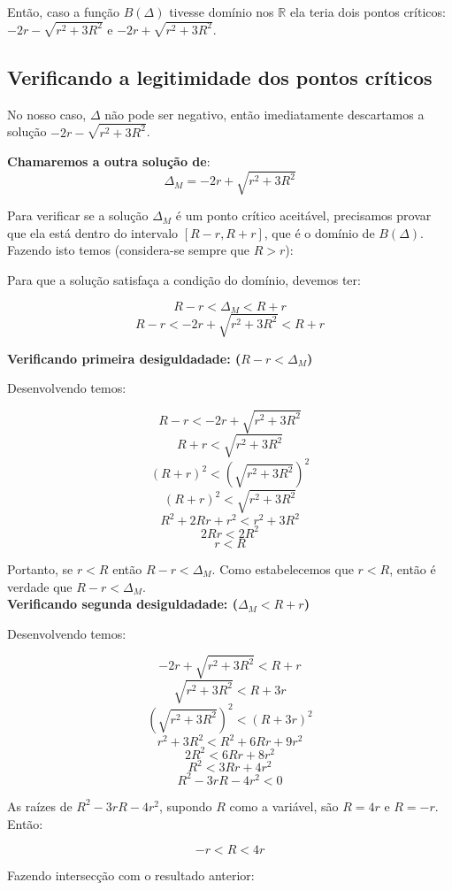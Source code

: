 \documentclass[a4paper, 12pt]{article}
\begin{document}
Então, caso a função $B\left(\Delta \right)$ tivesse domínio nos $\mathbb{R}$ ela teria dois pontos críticos:\\
$-2r - \sqrt{r^2+3R^2}$ e $-2r + \sqrt{r^2+3R^2}$.

\subsection{Verificando a legitimidade dos pontos críticos}

No nosso caso, $\Delta$ não pode ser negativo, então imediatamente descartamos a solução $-2r - \sqrt{r^2+3R^2}$.

\textbf{Chamaremos a outra solução de}:
\begin{equation}\label{delta_m}
    \boxed{\ \Delta _M=-2r+\sqrt{r^2+3R^2}\ }
\end{equation}

Para verificar se a solução $\Delta _M$ é um ponto crítico aceitável, precisamos provar que ela está dentro do intervalo $[R-r, R+r]$, que é o domínio de $B\left(\Delta \right)$. Fazendo isto temos (considera-se sempre que $R>r$):

Para que a solução satisfaça a condição do domínio, devemos ter:

$$R-r<\Delta _M<R+r$$
$$R-r<-2r+\sqrt{r^2+3R^2}<R+r$$

\textbf{Verificando primeira desiguldadade: ($R-r<\Delta_M$)}

Desenvolvendo temos:

$$R-r<-2r+\sqrt{r^2+3R^2}$$
$$R+r<\sqrt{r^2+3R^2}$$
$$\left(R+r\right)^2<\left(\sqrt{r^2+3R^2}\right)^2$$
$$\left(R+r\right)^2<\sqrt{r^2+3R^2}$$
$$R^2+2Rr+r^2<r^2+3R^2$$
$$2Rr<2R^2$$
$$r<R$$

Portanto, se $r<R$ então $R-r<\Delta_M$. Como estabelecemos que $r<R$, então é verdade que $R-r<\Delta_M$.\\

\textbf{Verificando segunda desiguldadade: ($\Delta_M<R+r$)}

Desenvolvendo temos:

$$-2r+\sqrt{r^2+3R^2}<R+r$$
$$\sqrt{r^2+3R^2}<R+3r$$
$$\left(\sqrt{r^2+3R^2}\right)^2<\left(R+3r\right)^2$$
$$r^2+3R^2<R^2+6Rr+9r^2$$
$$2R^2<6Rr+8r^2$$
$$R^2<3Rr+4r^2$$
$$R^2-3rR-4r^2<0$$

As raízes de $R^2-3rR-4r^2$, supondo $R$ como a variável, são $R=4r$ e $R=-r$. Então:

$$-r<R<4r$$

Fazendo intersecção com o resultado anterior:
\end{document}
